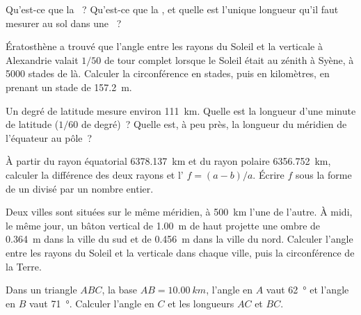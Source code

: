 \begin{exercise}[$\star$]\label{exo:g10:measuring-the-earth:2}
Qu'est-ce que la ~? Qu'est-ce que la , et quelle est
l'unique longueur qu'il faut mesurer au sol dans une ~?
\end{exercise}

\begin{exercise}[$\star$]\label{exo:g10:measuring-the-earth:3}
Ératosthène a trouvé que l'angle entre les rayons du Soleil et la verticale
à Alexandrie valait $1/50$ de tour complet lorsque le Soleil était au zénith
à Syène, à 5000 stades de là. Calculer la circonférence en stades, puis en
kilomètres, en prenant un stade de \qty{157.2}{m}.
\end{exercise}

\begin{exercise}[$\star$]\label{exo:g10:measuring-the-earth:4}
Un degré de latitude mesure environ \qty{111}{km}. Quelle est la longueur
d'une minute de latitude ($1/60$ de degré)~? Quelle est, à peu près, la
longueur du méridien de l'équateur au pôle~?
\end{exercise}

\begin{exercise}[$\star$]\label{exo:g10:measuring-the-earth:5}
À partir du rayon équatorial \qty{6378.137}{km} et du rayon polaire
\qty{6356.752}{km}, calculer la différence des deux rayons et
l' $f = (a-b)/a$. Écrire $f$ sous la forme de un divisé par un
nombre entier.
\end{exercise}

\begin{exercise}[$\star\star$]\label{exo:g10:measuring-the-earth:6}
Deux villes sont situées sur le même méridien, à \qty{500}{km} l'une de
l'autre. À midi, le même jour, un bâton vertical de \qty{1.00}{m} de haut
projette une ombre de \qty{0.364}{m} dans la ville du sud et de
\qty{0.456}{m} dans la ville du nord. Calculer l'angle entre les rayons du
Soleil et la verticale dans chaque ville, puis la circonférence de la Terre.
\end{exercise}

\begin{exercise}[$\star\star$]\label{exo:g10:measuring-the-earth:7}
Dans un triangle $ABC$, la base $AB = \qty{10.00}{km}$, l'angle en $A$ vaut
\qty{62}{\degree} et l'angle en $B$ vaut \qty{71}{\degree}. Calculer
l'angle en $C$ et les longueurs $AC$ et $BC$.
\end{exercise}

